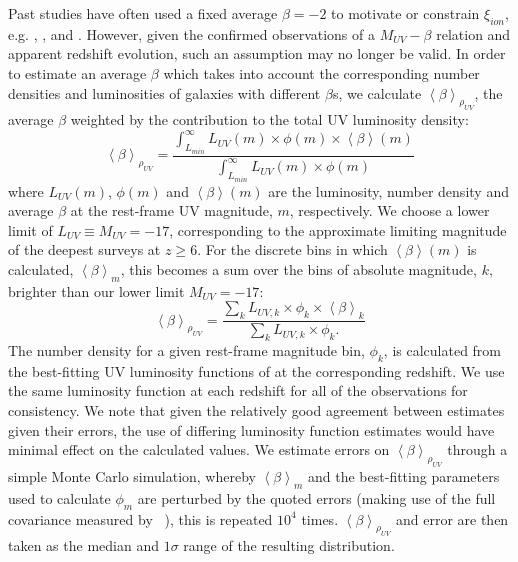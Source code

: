 Past studies have often used a fixed average $\beta = -2$ to motivate or constrain $\xi_{ion}$, e.g. \citet{Bolton:2007gc}, \citet{Ouchi:2009jd}, \citet{2010Natur.468...49R,Robertson:2013ji} and \citet{Kuhlen:2012ka}. However, given the confirmed observations of a $M_{UV}-\beta$ relation and apparent redshift evolution, such an assumption may no longer be valid. In order to estimate an average $\beta$ which takes into account the corresponding number densities and luminosities of galaxies with different $\beta$s, we calculate $\left \langle \beta  \right \rangle_{\rho_{UV}}$, the average $\beta$ weighted by the contribution to the total UV luminosity density:
\begin{equation}
\left \langle \beta  \right \rangle_{\rho_{UV}} = \frac{\int_{L_{min}}^{\infty}  L_{UV}(m) \times \phi(m) \times \left \langle \beta  \right \rangle (m)}{\int_{L_{min}}^{\infty} L_{UV}(m) \times \phi(m)}
\end{equation}
\noindent where $L_{UV}(m)$, $\phi(m)$ and $\left \langle \beta  \right \rangle (m)$ are the luminosity, number density and average $\beta$ at the rest-frame UV magnitude, $m$, respectively. We choose a lower limit of $L_{UV} \equiv M_{UV} = -17$, corresponding to the approximate limiting magnitude of the deepest surveys at $z\geq6$. For the discrete bins in which $\left \langle \beta  \right \rangle (m)$ is calculated, $\left \langle \beta  \right \rangle_{m}$, this becomes a sum over the bins of absolute magnitude, $k$, brighter than our lower limit $M_{UV} = -17$:
\begin{equation}
\left \langle \beta  \right \rangle_{\rho_{UV}} = \frac{\sum_{k}^{ }  L_{UV,k} \times \phi_{k} \times \left \langle \beta  \right \rangle_{k}}{\sum_{k}^{ } L_{UV,k} \times \phi_{k}.}
\end{equation}
\noindent The number density for a given rest-frame magnitude bin, $\phi_{k}$, is calculated from the best-fitting UV luminosity functions of \citet{Bouwens:2014tx} at the corresponding redshift. We use the same luminosity function at each redshift for all of the observations for consistency. We note that given the relatively good agreement between estimates given their errors, the use of differing luminosity function estimates would have minimal effect on the calculated values. We estimate errors on $\left \langle \beta  \right \rangle_{\rho_{UV}}$ through a simple Monte Carlo simulation, whereby $\left \langle \beta  \right \rangle_{m}$ and the best-fitting \citet{Schechter:1976gl} parameters used to calculate $\phi_{m}$ are perturbed by the quoted errors (making use of the full covariance measured by \citeauthor{Bouwens:2014tx}~\citeyear{Bouwens:2014tx}), this is repeated $10^{4}$ times. $\left \langle \beta  \right \rangle_{\rho_{UV}}$ and error are then taken as the median and $1\sigma$ range of the resulting distribution.

